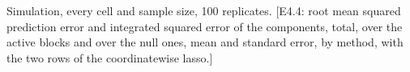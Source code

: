 \begin{table}[t]
\color{colR1}
\caption{Simulation, every cell and sample size, 100 replicates. [E4.4: root mean squared prediction error and integrated squared error of the components, total, over the active blocks and over the null ones, mean and standard error, by method, with the two rows of the coordinatewise lasso.]}
\label{tab:sim-sizes}
\centering
{}
\end{table}
